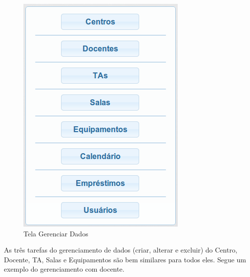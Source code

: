 \documentclass[openany,10pt,a4paper]{book}
\begin{document}
\begin{figure}[!htb]
     \centering
     \includegraphics[scale=0.4]{gerenciarDados.png}
     \caption{Tela Gerenciar Dados}
     \label{im_gerenciarDados}
 \end{figure} 


As três tarefas do gerenciamento de dados (criar, alterar e excluir) do Centro, Docente, TA, Salas e Equipamentos são bem similares para todos eles. Segue um exemplo do gerenciamento com docente.
\end{document}
